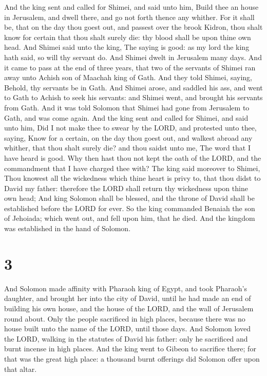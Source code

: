  And the king sent and called for Shimei, and said unto
him, Build thee an house in Jerusalem, and dwell there, and go not forth
thence any whither.  For it shall be, that on the day
thou goest out, and passest over the brook Kidron, thou shalt know for
certain that thou shalt surely die: thy blood shall be upon thine own
head.  And Shimei said unto the king, The saying is good:
as my lord the king hath said, so will thy servant do. And Shimei dwelt
in Jerusalem many days.  And it came to pass at the end
of three years, that two of the servants of Shimei ran away unto Achish
son of Maachah king of Gath. And they told Shimei, saying, Behold, thy
servants be in Gath.  And Shimei arose, and saddled his
ass, and went to Gath to Achish to seek his servants: and Shimei went,
and brought his servants from Gath.  And it was told
Solomon that Shimei had gone from Jerusalem to Gath, and was come again.
 And the king sent and called for Shimei, and said unto
him, Did I not make thee to swear by the LORD, and protested unto thee,
saying, Know for a certain, on the day thou goest out, and walkest
abroad any whither, that thou shalt surely die? and thou saidst unto me,
The word that I have heard is good.  Why then hast thou
not kept the oath of the LORD, and the commandment that I have charged
thee with?  The king said moreover to Shimei, Thou
knowest all the wickedness which thine heart is privy to, that thou
didst to David my father: therefore the LORD shall return thy wickedness
upon thine own head;  And king Solomon shall be blessed,
and the throne of David shall be established before the LORD for ever.
 So the king commanded Benaiah the son of Jehoiada; which
went out, and fell upon him, that he died. And the kingdom was
established in the hand of Solomon.

\hypertarget{section-2}{%
\section{3}\label{section-2}}

 And Solomon made affinity with Pharaoh king of Egypt, and
took Pharaoh's daughter, and brought her into the city of David, until
he had made an end of building his own house, and the house of the LORD,
and the wall of Jerusalem round about.  Only the people
sacrificed in high places, because there was no house built unto the
name of the LORD, until those days.  And Solomon loved the
LORD, walking in the statutes of David his father: only he sacrificed
and burnt incense in high places.  And the king went to
Gibeon to sacrifice there; for that was the great high place: a thousand
burnt offerings did Solomon offer upon that altar.

